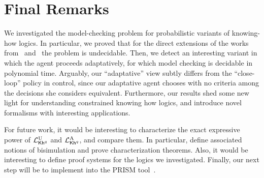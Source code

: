 \section{Final Remarks}
\label{sec:final}

We investigated the model-checking problem for probabilistic variants of knowing-how logics.
In particular, we proved that for the direct extensions of the works from~\cite{Wang15lori} and~\cite{AFSVQ21} the problem is undecidable. Then, we detect an interesting variant in which the agent proceeds adaptatively, for which model checking is decidable in polynomial time. Arguably, our ``adaptative'' view subtly differs from the ``close-loop'' policy in control, since our adaptative agent chooses with no criteria among the decisions she considers equivalent. Furthermore, our results shed some new light for understanding constrained knowing how logics, and introduce novel formalisms with interesting applications. 


For future work, it would be interesting to characterize the exact expressive power of ${\mathcal{L}^{\mathrm{U}}_{{\mathsf{Kh}}^q}}$ and ${\mathcal{L}^{\mathrm{A}}_{{\mathsf{Kh}}^q}}$, and compare them. In particular, define associated notions of bisimulation and prove characterization theorems. Also, it would be interesting to define proof systems for the logics we investigated. Finally, our next step will be to implement  into the PRISM tool~\cite{KwiatkowskaNP11}.